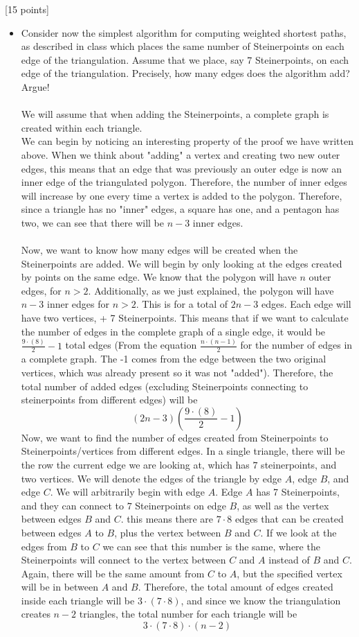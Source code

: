 \documentclass[12pt]{article}
\newcounter{ques}
\newenvironment{question}{\stepcounter{ques}{\noindent\bf Question \arabic{ques}:}}{\vspace{5mm}}
\begin{document}
\begin{question}[15 points]
\begin{itemize}
	\item Consider now the simplest algorithm for computing weighted shortest paths, as described in class which places the same number of Steinerpoints on each edge of the triangulation.   Assume that we place, say 7 Steinerpoints,  on each edge of the triangulation. Precisely, how many edges does the algorithm add? Argue!\\\\
  We will assume that when adding the Steinerpoints, a complete graph is created within each triangle.\\
  We can begin by noticing an interesting property of the proof we have written above. When we think about "adding" a vertex and creating two new outer edges, this means that an edge that was previously an outer edge is now an inner edge of the triangulated polygon. Therefore, the number of inner edges will increase by one every time a vertex is added to the polygon. Therefore, since a triangle has no "inner" edges, a square has one, and a pentagon has two, we can see that there will be $n-3$ inner edges.\\\\
  Now, we want to know how many edges will be created when the Steinerpoints are added. We will begin by only looking at the edges created by points on the same edge. We know that the polygon will have $n$ outer edges, for $n>2$. Additionally, as we just explained, the polygon will have $n-3$ inner edges for $n>2$. This is for a total of $2n-3$ edges. Each edge will have two vertices, + 7 Steinerpoints. This means that if we want to calculate the number of edges in the complete graph of a single edge, it would be $\frac{9\cdot(8)}{2}-1$ total edges (From the equation $\frac{n\cdot(n-1)}{2}$ for the number of edges in a complete graph. The -1 comes from the edge between the two original vertices, which was already present so it was not "added"). Therefore, the total number of added edges (excluding Steinerpoints connecting to steinerpoints from different edges) will be
  $$(2n-3)\left(\frac{9\cdot(8)}{2}-1\right)$$
  Now, we want to find the number of edges created from Steinerpoints to Steinerpoints/vertices from different edges. In a single triangle, there will be the row the current edge we are looking at, which has $7$ steinerpoints, and two vertices. We will denote the edges of the triangle by edge $A$, edge $B$, and edge $C$. We will arbitrarily begin with edge $A$. Edge $A$ has 7 Steinerpoints, and they can connect to $7$ Steinerpoints on edge $B$, as well as the vertex between edges $B$ and $C$. this means there are $7\cdot8$ edges that can be created between edges $A$ to $B$, plus the vertex between $B$ and $C$. If we look at the edges from $B$ to $C$ we can see that this number is the same, where the Steinerpoints will connect to the vertex between $C$ and $A$ instead of $B$ and $C$. Again, there will be the same amount from $C$ to $A$, but the specified vertex will be in between $A$ and $B$. Therefore, the total amount of edges created inside each triangle will be $3\cdot(7\cdot8)$, and since we know the triangulation creates $n-2$ triangles, the total number for each triangle will be $$3\cdot(7\cdot8)\cdot(n-2)$$

\end{itemize}
\end{question}
\end{document}
